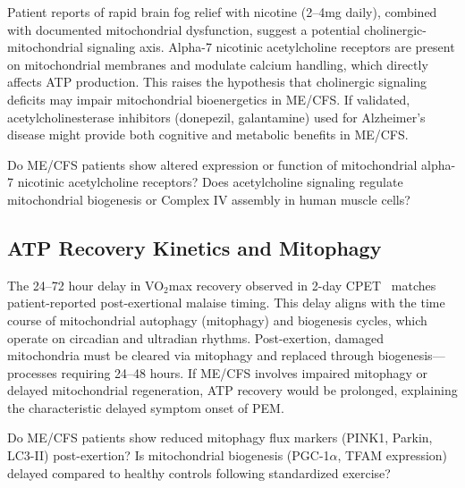 \begin{hypothesis}
\label{hyp:ach-mito}
Patient reports of rapid brain fog relief with nicotine (2--4mg daily), combined with documented mitochondrial dysfunction, suggest a potential cholinergic-mitochondrial signaling axis. Alpha-7 nicotinic acetylcholine receptors are present on mitochondrial membranes and modulate calcium handling, which directly affects ATP production. This raises the hypothesis that cholinergic signaling deficits may impair mitochondrial bioenergetics in ME/CFS. If validated, acetylcholinesterase inhibitors (donepezil, galantamine) used for Alzheimer's disease might provide both cognitive and metabolic benefits in ME/CFS.
\end{hypothesis}

\begin{open_question}
\label{q:mito-ach-receptors}
Do ME/CFS patients show altered expression or function of mitochondrial alpha-7 nicotinic acetylcholine receptors? Does acetylcholine signaling regulate mitochondrial biogenesis or Complex IV assembly in human muscle cells?
\end{open_question}

\subsection{ATP Recovery Kinetics and Mitophagy}
\label{subsec:atp-recovery-mitophagy}

\begin{hypothesis}
\label{hyp:mitophagy-pem}
The 24--72 hour delay in VO$_2$max recovery observed in 2-day CPET~\cite{Lim2020} matches patient-reported post-exertional malaise timing. This delay aligns with the time course of mitochondrial autophagy (mitophagy) and biogenesis cycles, which operate on circadian and ultradian rhythms. Post-exertion, damaged mitochondria must be cleared via mitophagy and replaced through biogenesis---processes requiring 24--48 hours. If ME/CFS involves impaired mitophagy or delayed mitochondrial regeneration, ATP recovery would be prolonged, explaining the characteristic delayed symptom onset of PEM.
\end{hypothesis}

\begin{open_question}
\label{q:mitophagy-markers}
Do ME/CFS patients show reduced mitophagy flux markers (PINK1, Parkin, LC3-II) post-exertion? Is mitochondrial biogenesis (PGC-1$\alpha$, TFAM expression) delayed compared to healthy controls following standardized exercise?
\end{open_question}

